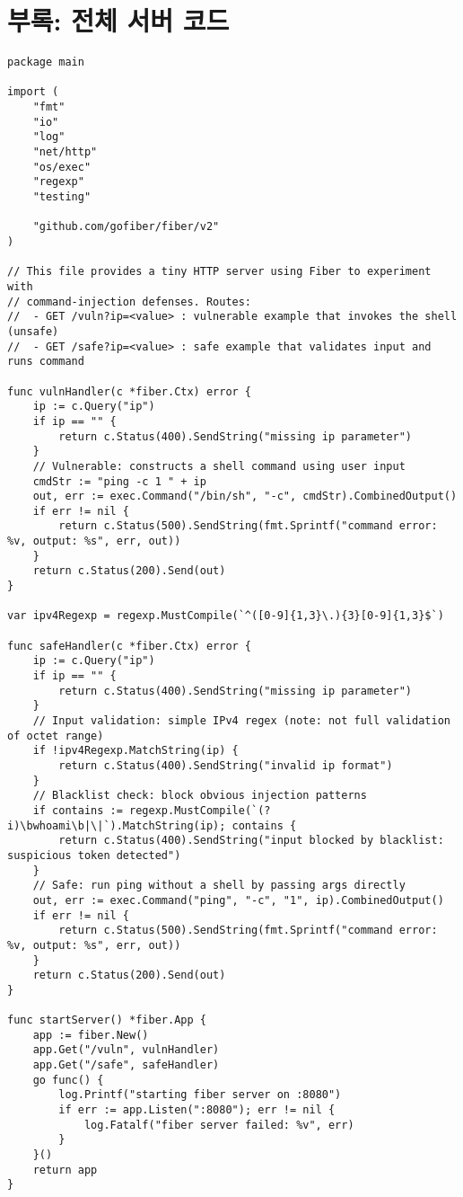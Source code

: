 \documentclass{article}
\begin{document}
\section{부록: 전체 서버 코드}
\begin{lstlisting}[caption={Go 언어와 Fiber 프레임워크를 사용한 서버 구현 예시}, label={lst:go-server}, showspaces=false,showstringspaces=false]
package main

import (
	"fmt"
	"io"
	"log"
	"net/http"
	"os/exec"
	"regexp"
	"testing"

	"github.com/gofiber/fiber/v2"
)

// This file provides a tiny HTTP server using Fiber to experiment with
// command-injection defenses. Routes:
//  - GET /vuln?ip=<value> : vulnerable example that invokes the shell (unsafe)
//  - GET /safe?ip=<value> : safe example that validates input and runs command

func vulnHandler(c *fiber.Ctx) error {
	ip := c.Query("ip")
	if ip == "" {
		return c.Status(400).SendString("missing ip parameter")
	}
	// Vulnerable: constructs a shell command using user input
	cmdStr := "ping -c 1 " + ip
	out, err := exec.Command("/bin/sh", "-c", cmdStr).CombinedOutput()
	if err != nil {
		return c.Status(500).SendString(fmt.Sprintf("command error: %v, output: %s", err, out))
	}
	return c.Status(200).Send(out)
}

var ipv4Regexp = regexp.MustCompile(`^([0-9]{1,3}\.){3}[0-9]{1,3}$`)

func safeHandler(c *fiber.Ctx) error {
	ip := c.Query("ip")
	if ip == "" {
		return c.Status(400).SendString("missing ip parameter")
	}
	// Input validation: simple IPv4 regex (note: not full validation of octet range)
	if !ipv4Regexp.MatchString(ip) {
		return c.Status(400).SendString("invalid ip format")
	}
	// Blacklist check: block obvious injection patterns
	if contains := regexp.MustCompile(`(?i)\bwhoami\b|\|`).MatchString(ip); contains {
		return c.Status(400).SendString("input blocked by blacklist: suspicious token detected")
	}
	// Safe: run ping without a shell by passing args directly
	out, err := exec.Command("ping", "-c", "1", ip).CombinedOutput()
	if err != nil {
		return c.Status(500).SendString(fmt.Sprintf("command error: %v, output: %s", err, out))
	}
	return c.Status(200).Send(out)
}

func startServer() *fiber.App {
	app := fiber.New()
	app.Get("/vuln", vulnHandler)
	app.Get("/safe", safeHandler)
	go func() {
		log.Printf("starting fiber server on :8080")
		if err := app.Listen(":8080"); err != nil {
			log.Fatalf("fiber server failed: %v", err)
		}
	}()
	return app
}


\end{lstlisting}
\end{document}
